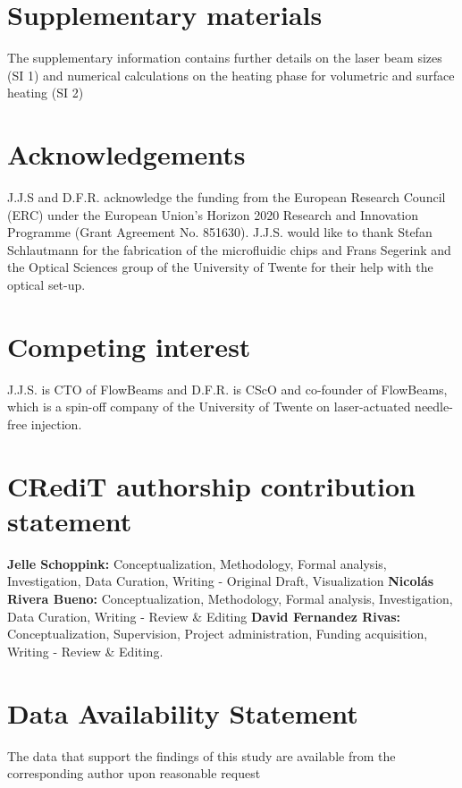 \documentclass[11pt]{article}
\begin{document}
\section*{Supplementary materials}
The supplementary information contains further details on the laser beam sizes (SI 1) and numerical calculations on the heating phase for volumetric and surface heating (SI 2)

\section*{Acknowledgements}
J.J.S and D.F.R. acknowledge the funding from the European Research Council (ERC) under the European Union’s Horizon 2020 Research and Innovation Programme (Grant Agreement No. 851630). J.J.S. would like to thank Stefan Schlautmann for the fabrication of the microfluidic chips and Frans Segerink and the Optical Sciences group of the University of Twente for their help with the optical set-up.

\section*{Competing interest}
J.J.S. is CTO of FlowBeams and D.F.R. is CScO and co-founder of FlowBeams, which is a spin-off company of the University of Twente on laser-actuated needle-free injection.

\section*{CRediT authorship contribution statement}
\textbf{Jelle Schoppink:} Conceptualization, Methodology, Formal analysis, Investigation, Data Curation, Writing - Original Draft, Visualization
\textbf{Nicolás Rivera Bueno:} Conceptualization, Methodology, Formal analysis, Investigation, Data Curation, Writing - Review \& Editing
\textbf{David Fernandez Rivas:} Conceptualization, Supervision, Project administration, Funding acquisition, Writing - Review \& Editing.

\section*{Data Availability Statement}
The data that support the findings of this study are available from the corresponding  author upon reasonable request


\printbibliography 
\end{document}
